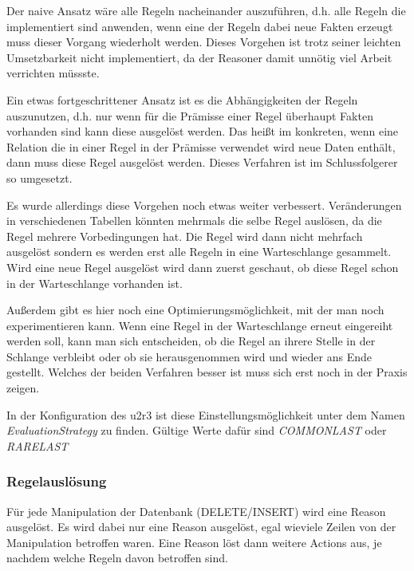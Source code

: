 Der naive Ansatz wäre alle Regeln nacheinander auszuführen, d.h. alle Regeln die implementiert sind anwenden, wenn eine der Regeln dabei neue Fakten erzeugt muss dieser Vorgang wiederholt werden. Dieses Vorgehen ist trotz seiner leichten Umsetzbarkeit nicht implementiert, da der Reasoner damit unnötig viel Arbeit verrichten müssste.

Ein etwas fortgeschrittener Ansatz ist es die Abhängigkeiten der Regeln auszunutzen, d.h. nur wenn für die Prämisse einer Regel überhaupt Fakten vorhanden sind kann diese ausgelöst werden. Das heißt im konkreten, wenn eine Relation die in einer Regel in der Prämisse verwendet wird neue Daten enthält, dann muss diese Regel ausgelöst werden. Dieses Verfahren ist im Schlussfolgerer so umgesetzt.

Es wurde allerdings diese Vorgehen noch etwas weiter verbessert. Veränderungen in verschiedenen Tabellen könnten mehrmals die selbe Regel auslösen, da die Regel mehrere Vorbedingungen  hat. Die Regel wird dann nicht mehrfach ausgelöst sondern es werden erst alle Regeln in eine Warteschlange gesammelt. Wird eine neue Regel ausgelöst wird dann zuerst geschaut, ob diese Regel schon in der Warteschlange vorhanden ist.

Außerdem gibt es hier noch eine Optimierungsmöglichkeit, mit der man noch experimentieren kann. Wenn eine Regel in der Warteschlange erneut eingereiht werden soll, kann man sich entscheiden, ob die Regel an ihrere Stelle in der Schlange verbleibt oder ob sie herausgenommen wird und wieder ans Ende gestellt. Welches der beiden Verfahren besser ist muss sich erst noch in der Praxis zeigen.

In der Konfiguration des u2r3 ist diese Einstellungsmöglichkeit unter dem Namen \emph{EvaluationStrategy} zu finden. Gültige Werte dafür sind \emph{COMMONLAST} oder \emph{RARELAST}

\subsubsection{Regelauslösung}
Für jede Manipulation der Datenbank (DELETE/INSERT) wird eine Reason ausgelöst. Es wird dabei nur eine Reason ausgelöst, egal wieviele Zeilen von der Manipulation betroffen waren. Eine Reason löst dann weitere Actions aus, je nachdem welche Regeln davon betroffen sind.


